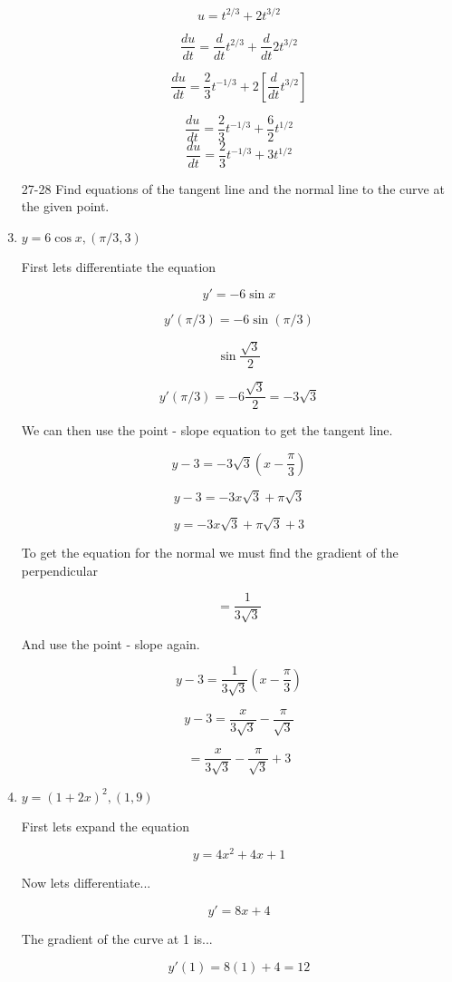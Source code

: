 \documentclass{article}
\begin{document}
\begin{enumerate}
			$$u = t^{2/3} + 2t^{3/2}$$

			$$\frac{du}{dt} = \frac{d}{dt} t^{2/3} + \frac{d}{dt} 2t^{3/2}$$

			$$\frac{du}{dt} = \frac{2}{3} t^{-1/3} + 2[\frac{d}{dt} t^{3/2}]$$

			$$\frac{du}{dt} = \frac{2}{3} t^{-1/3} + \frac{6}{2} t^{1/2}$$
			$$\frac{du}{dt} = \frac{2}{3} t^{-1/3} + 3t^{1/2}$$

		\item[27-28] Find equations of the tangent line and the normal line to
				the curve at the given point.

		\item $y = 6 \cos x, (\pi/3,3)$

			First lets differentiate the equation

			$$y' = - 6 \sin x$$

			$$y'(\pi/3) = - 6 \sin (\pi/3)$$

			$$\sin \frac{\sqrt{3}}{2}$$

			$$y'(\pi/3) = - 6 \frac{\sqrt{3}}{2} = - 3 \sqrt{3}$$

			We can then use the point - slope equation to get the tangent line.

			$$y - 3 = - 3 \sqrt{3} ( x - \frac{\pi}{3} )$$

			$$y - 3= - 3x\sqrt{3} + \pi \sqrt{3}$$

			$$y = - 3x\sqrt{3} + \pi \sqrt{3} + 3$$

			To get the equation for the normal we must find the gradient of the perpendicular

			$$ = \frac{1}{3\sqrt{3}}$$

			And use the point - slope again.

			$$y - 3 = \frac{1}{3\sqrt{3}} (x - \frac{\pi}{3})$$

			$$y - 3 = \frac{x}{3\sqrt{3}} - \frac{\pi}{\sqrt{3}}$$

			$$ = \frac{x}{3\sqrt{3}} - \frac{\pi}{\sqrt{3}} + 3$$

		\item $y = (1 + 2x)^2, (1,9)$

			First lets expand the equation

			$$y = 4x^2 + 4x + 1$$

			Now lets differentiate...

			$$y' = 8x + 4$$

			The gradient of the curve at 1 is...

			$$y'(1) = 8(1) + 4 = 12$$


\end{enumerate}
\end{document}
